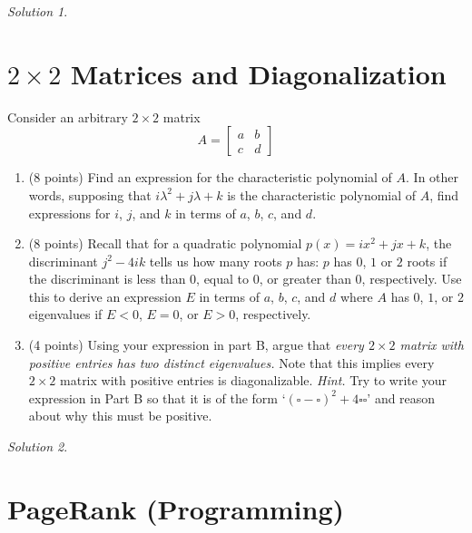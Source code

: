 \documentclass{article}
\theoremstyle{remark}
\newtheorem*{solution}{Solution}
\begin{document}
\medskip

\begin{solution}
\end{solution}

\pagebreak
\section{$2\times 2$ Matrices and Diagonalization}

Consider an arbitrary $2 \times 2$ matrix
\begin{displaymath}
  A =
  \begin{bmatrix}
    a & b \\
    c & d
  \end{bmatrix}
\end{displaymath}

\begin{enumerate}
\item (8 points)
  Find an expression for the characteristic polynomial of $A$.
  In other words, supposing that $i\lambda^2 + j\lambda + k$ is the characteristic polynomial of $A$, find expressions for $i$, $j$, and $k$ in terms of $a$, $b$, $c$, and $d$.
\item (8 points)
  Recall that for a quadratic polynomial $p(x) = ix^2 + jx + k$, the discriminant $j^2 - 4ik$ tells us how many roots $p$ has: $p$ has $0$, $1$ or $2$ roots if the discriminant is less than $0$, equal to $0$, or greater than $0$, respectively.
  Use this to derive an expression $E$ in terms of $a$, $b$, $c$, and $d$ where $A$ has $0$, $1$, or $2$ eigenvalues if $E < 0$, $E = 0$, or $E > 0$, respectively.
\item (4 points) Using your expression in part B, argue that \textit{every $2 \times 2$ matrix with positive entries has two distinct eigenvalues.}
  Note that this implies every $2 \times 2$ matrix with positive entries is diagonalizable.
  \textit{Hint.} Try to write your expression in Part B so that it is of the form `$(\square - \square)^2 + 4\square\square$' and reason about why this must be positive.
\end{enumerate}
\medskip

\begin{solution}
\end{solution}

\pagebreak
\section{PageRank (Programming)}
\end{document}
